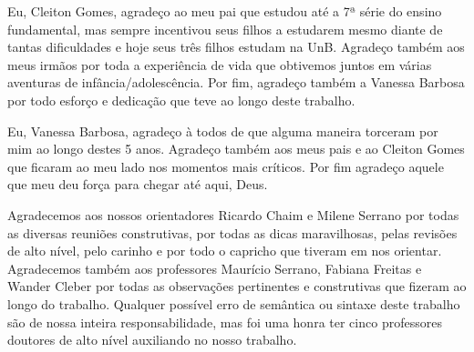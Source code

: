 \begin{agradecimentos}
Eu, Cleiton Gomes, agradeço ao meu pai que estudou até a 7ª série do ensino fundamental, mas sempre incentivou seus filhos a estudarem mesmo diante de tantas dificuldades e hoje seus três filhos estudam na UnB. Agradeço também aos meus irmãos por toda a experiência de vida que obtivemos juntos em várias aventuras de infância/adolescência. Por fim, agradeço também a Vanessa Barbosa por todo esforço e dedicação que teve ao longo deste trabalho.

Eu, Vanessa Barbosa, agradeço à todos de que alguma maneira torceram por mim ao longo destes 5 anos. Agradeço também aos meus pais e ao Cleiton Gomes que ficaram ao meu lado nos momentos mais críticos. Por fim agradeço aquele que meu deu força para chegar até aqui, Deus.

Agradecemos aos nossos orientadores Ricardo Chaim e Milene Serrano por todas as diversas reuniões construtivas, por todas as dicas maravilhosas, pelas revisões de alto nível, pelo carinho e por todo o capricho que tiveram em nos orientar. Agradecemos também aos professores Maurício Serrano, Fabiana Freitas e Wander Cleber por todas as observações pertinentes e construtivas que fizeram ao longo do trabalho. Qualquer possível erro de semântica ou sintaxe deste trabalho são de nossa inteira responsabilidade, mas foi uma honra ter cinco professores doutores de alto nível auxiliando no nosso trabalho.

\end{agradecimentos}

